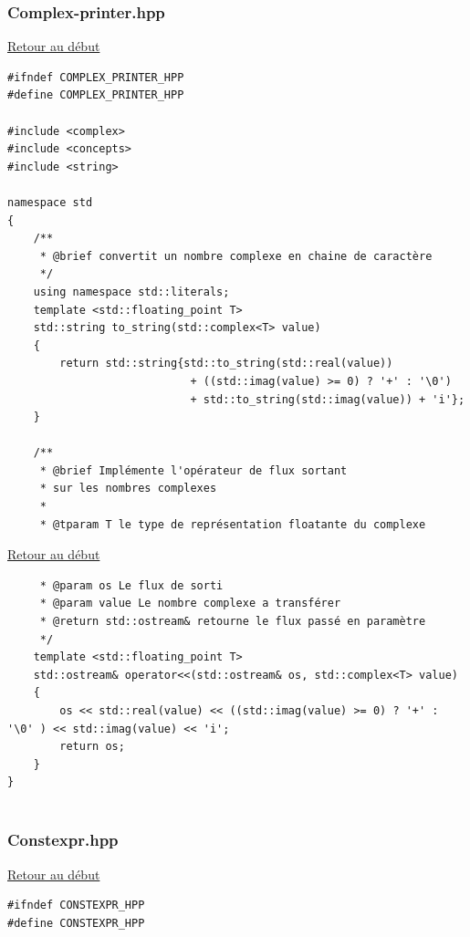 {\begin{frame}[fragile]
\begin{verbatim}
\end{verbatim}
\end{frame}

\begin{frame}[fragile]
\label{Complexprinter.hpp}
\frametitle{Complex-printer.hpp}
\hyperlink{conclusion}{Retour au début}\newline
\begin{verbatim}
#ifndef COMPLEX_PRINTER_HPP
#define COMPLEX_PRINTER_HPP

#include <complex>
#include <concepts>
#include <string>

namespace std
{
    /**
     * @brief convertit un nombre complexe en chaine de caractère
     */
    using namespace std::literals;
    template <std::floating_point T>
    std::string to_string(std::complex<T> value)
    {
        return std::string{std::to_string(std::real(value)) 
                            + ((std::imag(value) >= 0) ? '+' : '\0') 
                            + std::to_string(std::imag(value)) + 'i'};
    }

    /**
     * @brief Implémente l'opérateur de flux sortant
     * sur les nombres complexes
     * 
     * @tparam T le type de représentation floatante du complexe
\end{verbatim}
\end{frame}

\begin{frame}[fragile]
\hyperlink{conclusion}{Retour au début}\newline
\begin{verbatim}
     * @param os Le flux de sorti
     * @param value Le nombre complexe a transférer
     * @return std::ostream& retourne le flux passé en paramètre
     */
    template <std::floating_point T>
    std::ostream& operator<<(std::ostream& os, std::complex<T> value)
    {
        os << std::real(value) << ((std::imag(value) >= 0) ? '+' : '\0' ) << std::imag(value) << 'i';
        return os;
    }
}


\end{verbatim}
\end{frame}

\begin{frame}[fragile]
\label{Constexpr.hpp}
\frametitle{Constexpr.hpp}
\hyperlink{conclusion}{Retour au début}\newline
\begin{verbatim}
#ifndef CONSTEXPR_HPP
#define CONSTEXPR_HPP


\end{verbatim}
\end{frame}}
